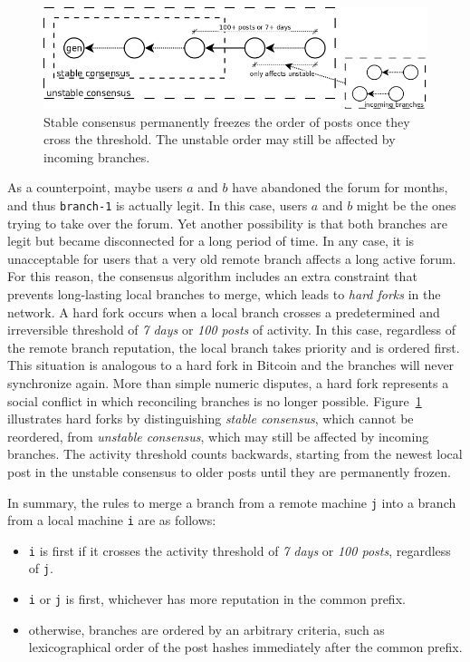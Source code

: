 \documentclass[12pt]{article}
\newcommand{\code}[1]  {\texttt{\footnotesize{#1}}}
\begin{document}
\begin{figure}
\centering
\includegraphics[width=\textwidth]{n100-d7.png}
\caption{
    Stable consensus permanently freezes the order of posts once they cross
    the threshold.
    The unstable order may still be affected by incoming branches.
}
\label{fig.hard}
\end{figure}

As a counterpoint, maybe users $a$ and $b$ have abandoned the forum for months,
and thus \code{branch-1} is actually legit.
In this case, users $a$ and $b$ might be the ones trying to take over the
forum.
Yet another possibility is that both branches are legit but became disconnected
for a long period of time.
In any case, it is unacceptable for users that a very old remote branch affects
a long active forum.
%
For this reason, the consensus algorithm includes an extra constraint that
prevents long-lasting local branches to merge, which leads to \emph{hard forks}
in the network.
A hard fork occurs when a local branch crosses a predetermined and irreversible
threshold of \emph{7 days} or \emph{100 posts} of activity.
In this case, regardless of the remote branch reputation, the local branch
takes priority and is ordered first.
This situation is analogous to a hard fork in Bitcoin and the branches will
never synchronize again.
More than simple numeric disputes, a hard fork represents a social conflict in
which reconciling branches is no longer possible.
%
Figure~\ref{fig.hard} illustrates hard forks by distinguishing \emph{stable
consensus}, which cannot be reordered, from \emph{unstable consensus}, which
may still be affected by incoming branches.
The activity threshold counts backwards, starting from the newest local post
in the unstable consensus to older posts until they are permanently frozen.

In summary, the rules to merge a branch from a remote machine \code{j} into a
branch from a local machine \code{i} are as follows:
\begin{itemize}
    \item \code{i} is first if it crosses the activity threshold of
          \emph{7 days} or \emph{100 posts}, regardless of \code{j}.
    \item \code{i} or \code{j} is first, whichever has more reputation in the
          common prefix.
    \item otherwise, branches are ordered by an arbitrary criteria, such as
          lexicographical order of the post hashes immediately after the
          common prefix.
\end{itemize}
\end{document}
